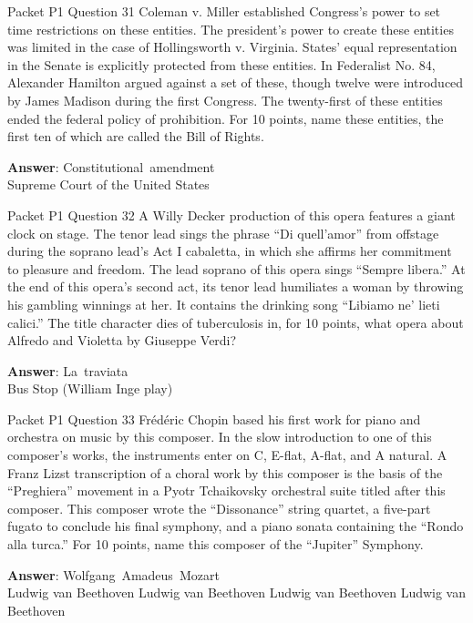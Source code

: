 \begin{frame}{Packet P1 Question 31}
Coleman v. Miller established       Congress's power to set time restrictions on these entities. The president's power to create these entities was limited in the case of Hollingsworth v. Virginia. States' equal representation in the Senate is explicitly protected from these entities. In Federalist No. 84, Alexander Hamilton argued against a set of these, though twelve were introduced by James Madison during the first Congress. The twenty-first of these entities ended the federal policy of prohibition. For 10 points, name these entities, the first ten of which are called the Bill of Rights.  

\textbf{Answer}: Constitutional\ amendment\\
 Supreme Court of the United States
\end{frame}

\begin{frame}{Packet P1 Question 32}
A Willy Decker production   of this opera features a giant clock on stage. The tenor lead sings the phrase ``Di quell'amor'' from offstage during the soprano lead's Act I cabaletta, in which     she affirms her commitment to pleasure and freedom. The lead soprano of this opera sings ``Sempre libera.'' At the end of this opera's second act, its tenor lead humiliates a woman by throwing his gambling winnings at her. It contains the drinking song ``Libiamo   ne' lieti calici.''   The title character dies of tuberculosis in, for 10 points, what opera about Alfredo and Violetta by Giuseppe Verdi?

\textbf{Answer}: La\ traviata\\
 Bus Stop (William Inge play)
\end{frame}

\begin{frame}{Packet P1 Question 33}
Frédéric Chopin based his first work for piano and orchestra on music by this composer. In the slow introduction to one of this composer's works, the instruments enter on C, E-flat, A-flat, and A natural. A Franz Lizst transcription of a choral work by this composer   is the basis of the ``Preghiera'' movement in a Pyotr Tchaikovsky orchestral suite titled after this composer. This composer wrote the ``Dissonance'' string quartet, a five-part fugato to conclude his final symphony, and   a piano sonata containing   the ``Rondo alla   turca.'' For 10 points,   name this composer of the ``Jupiter'' Symphony.  

\textbf{Answer}: Wolfgang\ Amadeus\ Mozart\\
 Ludwig van Beethoven
 Ludwig van Beethoven
 Ludwig van Beethoven
 Ludwig van Beethoven
\end{frame}

